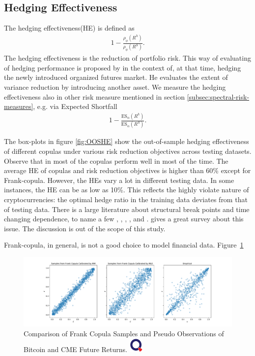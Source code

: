 \subsection{Hedging Effectiveness}\label{subsec:hedging-effectiveness}
The hedging effectiveness(HE) is defined as
\begin{align}
  1- \frac{\rho_\phi(R^h)}{\rho_\phi(R^S)}.
  \end{align}
The hedging effectiveness is the reduction of portfolio risk.
This way of evaluating of hedging performance is proposed by \cite{ederington1979hedging} in the context of, at that time, hedging the newly introduced
organized futures market.
He evaluates the extent of variance reduction by introducing another asset.
We measure the hedging effectiveness also in other risk measure mentioned in section \ref{subsec:spectral-risk-measures},
e.g. via Expected Shortfall
\begin{align}
  1- \frac{\text{ES}_\alpha(R^h)}{\text{ES}_\alpha(R^S)}.
  \end{align}

The box-plots in figure \ref{fig:OOSHE} show the out-of-sample hedging effectiveness of different copulas under various risk
reduction objectives across testing datasets.
Observe that in most of the copulas perform well in most of the time.
The average HE of copulas and risk reduction objectives is higher than 60\% except for Frank-copula.
However, the HEs vary a lot in different testing data.
In some instances, the HE can be as low as 10\%.
This reflects the highly violate nature of cryptocurrencies:
the optimal hedge ratio in the training data deviates from that of testing data.
There is a large literature about structural break points and time changing dependence, to name a few
\citet{hafner2012dynamic}, \citet{patton2006modelling}, \citet{creal2008general},
\citet{engle2002dynamic}, and \citet{giacomini2009inhomogeneous}.
\citet{manner2012survey} gives a great survey about this issue.
The discussion is out of the scope of this study.\medskip

Frank-copula, in general, is not a good choice to model financial data.
Figure~\ref{fig:Frank}

\begin{figure}[th]
   \centering
   \includegraphics[width=\textwidth]{_pics/Frank.pdf}
   \caption{Comparison of Frank Copula Samples and Pseudo Observations of Bitcoin and CME Future Returns.
   \href{http://www.quantlet.com/}{\includegraphics[width=20pt]{_pics/qletlogo_tr.png}}}
   \label{fig:Frank}
\end{figure}

